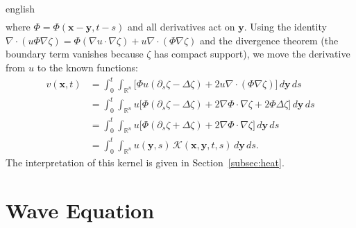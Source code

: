 \documentclass[../0000.tex]{subfiles}
\begin{document}
\begin{hyphenrules}{english}
\begin{align}
\end{align}
where $\Phi=\Phi(\mathbf{x}-\mathbf{y},t-s)$ and all derivatives act on $\mathbf{y}$. Using the identity
$\nabla\cdot(u\Phi\nabla\zeta)=\Phi(\nabla u\cdot\nabla\zeta)+u\nabla\cdot(\Phi\nabla\zeta)$ and the
divergence theorem (the boundary term vanishes because $\zeta$ has compact support), we move the
derivative from $u$ to the known functions:
\begin{align}
  v(\mathbf{x},t)&=\int_0^t\!\!\int_{\mathbb{R}^n}\Big[\Phi u(\partial_s\zeta-\Delta\zeta)+2u\nabla\cdot(\Phi\nabla\zeta)\Big]\,d\mathbf{y}\,d s \label{eq:cut-6}\\
         &=\int_0^t\!\!\int_{\mathbb{R}^n}u\Big[\Phi(\partial_s\zeta-\Delta\zeta)+2\nabla\Phi\cdot\nabla\zeta+2\Phi\Delta\zeta\Big]\,d\mathbf{y}\,d s \label{eq:cut-7}\\
         &=\int_0^t\!\!\int_{\mathbb{R}^n}u\Big[\Phi(\partial_s\zeta+\Delta\zeta)+2\nabla\Phi\cdot\nabla\zeta\Big]\,d\mathbf{y}\,d s \label{eq:cut-8}\\
         &=\int_0^t\!\!\int_{\mathbb{R}^n}u(\mathbf{y},s)\,\mathcal{K}(\mathbf{x},\mathbf{y},t,s)\,d\mathbf{y}\,d s. \label{eq:app-cut-9}
\end{align}
The interpretation of this kernel is given in Section~\ref{subsec:heat}.

\section{Wave Equation}\label{app-sec:wave}


\end{hyphenrules}
\end{document}
